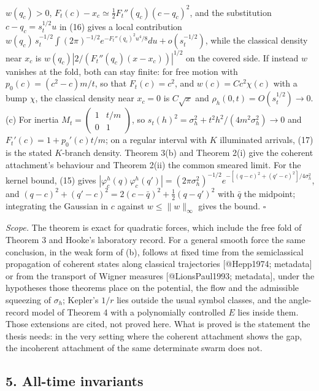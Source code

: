 \documentclass[11pt,a4paper]{article}
\begin{document}
\(w(q_c)>0\), \(F_t(c)-x_c\simeq\tfrac12F_t''(q_c)(c-q_c)^2\), and the
substitution \(c-q_c=s_t^{1/2}u\) in (16) gives a local contribution
\(w(q_c)\,s_t^{-1/2}\int(2\pi)^{-1/2}e^{-F_t''(q_c)^2u^4/8}du+o(s_t^{-1/2})\),
while the classical density near \(x_c\) is
\(w(q_c)|2/(F_t''(q_c)(x-x_c))|^{1/2}\) on the covered side. If instead
\(w\) vanishes at the fold, both can stay finite: for free motion with
\(p_0(c)=(c^2-c)m/t\), so that \(F_t(c)=c^2\), and \(w(c)=Cc^2\chi(c)\)
with a bump \(\chi\), the classical density near \(x_c=0\) is
\(C\sqrt x\) and \(\rho_h(0,t)=O(s_t^{1/2})\to0\). (c) For inertia
\(M_t=\begin{pmatrix}1&t/m\\0&1\end{pmatrix}\), so
\(s_t(h)^2=\sigma_h^2+t^2h^2/(4m^2\sigma_h^2)\to0\) and
\(F_t'(c)=1+p_0'(c)t/m\); on a regular interval with \(K\) illuminated
arrivals, (17) is the stated \(K\)-branch density. Theorem 3(b) and
Theorem 2(i) give the coherent attachment's behaviour and Theorem 2(ii)
the common smeared limit. For the kernel bound, (15) gives
\(|\varphi^h_c(q)\varphi^h_c(q')|=(2\pi\sigma_h^2)^{-1/2} e^{-[(q-c)^2+(q'-c)^2]/4\sigma_h^2}\),
and \((q-c)^2+(q'-c)^2=2(c-\bar q)^2+\tfrac12(q-q')^2\) with \(\bar q\)
the midpoint; integrating the Gaussian in \(c\) against
\(w\le\|w\|_\infty\) gives the bound. \(\square\)

\emph{Scope.} The theorem is exact for quadratic forces, which include
the free fold of Theorem 3 and Hooke's laboratory record. For a general
smooth force the same conclusion, in the weak form of (b), follows at
fixed time from the semiclassical propagation of coherent states along
classical trajectories {[}@Hepp1974; metadata{]} or from the transport
of Wigner measures {[}@LionsPaul1993; metadata{]}, under the hypotheses
those theorems place on the potential, the flow and the admissible
squeezing of \(\sigma_h\); Kepler's \(1/r\) lies outside the usual
symbol classes, and the angle-record model of Theorem 4 with a
polynomially controlled \(E\) lies inside them. Those extensions are
cited, not proved here. What is proved is the statement the thesis
needs: in the very setting where the coherent attachment shows the gap,
the incoherent attachment of the same determinate swarm does not.

\hypertarget{all-time-invariants}{%
\subsection{5. All-time invariants}\label{all-time-invariants}}
\end{document}
